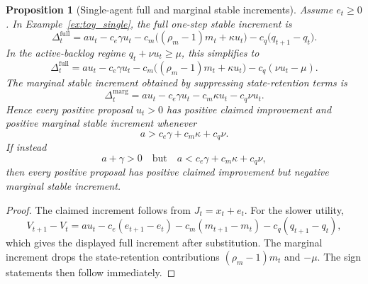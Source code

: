 \documentclass[11pt]{article}
\newtheorem{proposition}[theorem]{Proposition}
\theoremstyle{definition}
\newcommand{\1}{\mathbf{1}}
\begin{document}
\begin{proposition}[Single-agent full and marginal stable increments]\label{prop:toy_single_threshold}
Assume $e_t\ge0$. In Example~\ref{ex:toy_single}, the full one-step stable increment is
\[
\Delta_t^{\mathrm{full}}
=
a u_t - c_e\gamma u_t - c_m\bigl((\rho_m-1)m_t+\kappa u_t\bigr)-c_q\bigl(q_{t+1}-q_t\bigr).
\]
In the active-backlog regime $q_t+\nu u_t\ge \mu$, this simplifies to
\[
\Delta_t^{\mathrm{full}}
=
a u_t - c_e\gamma u_t - c_m\bigl((\rho_m-1)m_t+\kappa u_t\bigr)-c_q(\nu u_t-\mu).
\]
The marginal stable increment obtained by suppressing state-retention terms is
\[
\Delta_t^{\mathrm{marg}}
=
a u_t - c_e\gamma u_t - c_m\kappa u_t - c_q\nu u_t.
\]
Hence every positive proposal $u_t>0$ has positive claimed improvement and positive marginal stable increment whenever
\[
a > c_e\gamma + c_m\kappa + c_q\nu.
\]
If instead
\[
a+\gamma>0
\quad\text{but}\quad
a < c_e\gamma + c_m\kappa + c_q\nu,
\]
then every positive proposal has positive claimed improvement but negative marginal stable increment.
\end{proposition}

\begin{proof}
The claimed increment follows from $J_t=x_t+e_t$. For the slower utility,
\[
V_{t+1}-V_t = a u_t - c_e(e_{t+1}-e_t) - c_m(m_{t+1}-m_t) - c_q(q_{t+1}-q_t),
\]
which gives the displayed full increment after substitution. The marginal increment drops the state-retention contributions $(\rho_m-1)m_t$ and $-\mu$. The sign statements then follow immediately.
\end{proof}
\end{document}
